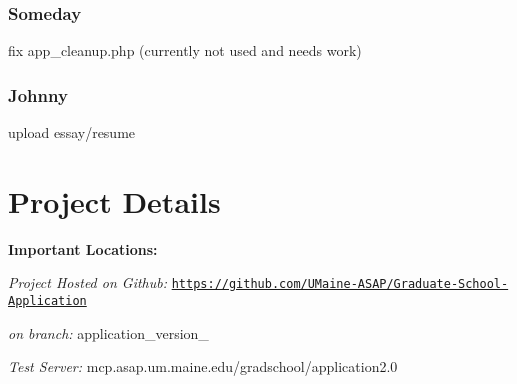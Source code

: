 \subsubsection*{Someday}


\begin{DoxyItemize}
\item fix app\-\_\-cleanup.\-php (currently not used and needs work)
\end{DoxyItemize}

\subsubsection*{Johnny}


\begin{DoxyItemize}
\item upload essay/resume
\end{DoxyItemize}

\section*{Project Details}

{\bfseries Important Locations\-:}


\begin{DoxyItemize}
\item {\itshape Project Hosted on Github\-:} \href{https://github.com/UMaine-ASAP/Graduate-School-Application}{\tt https\-://github.\-com/\-U\-Maine-\/\-A\-S\-A\-P/\-Graduate-\/\-School-\/\-Application}
\begin{DoxyItemize}
\item {\itshape on branch\-:} application\-\_\-version\-\_
\end{DoxyItemize}
\item {\itshape Test Server\-:} mcp.\-asap.\-um.\-maine.\-edu/gradschool/application2.0 
\end{DoxyItemize}